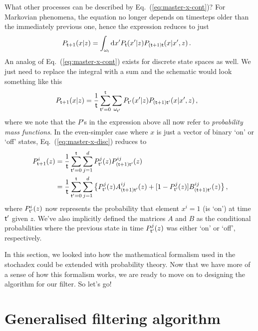 What other processes can be described by Eq.~(\ref{eq:master-x-cont})? For Markovian phenomena, the equation no longer depends on timesteps older than the immediately previous one, hence the expression reduces to just
\begin{align}
P_{{\sf t}+1}(x\vert z) &= \int_{\omega_{\sf t}}{\rm d}x' P_{\sf t}(x'\vert z) P_{({\sf t}+1){\sf t}}(x\vert x',z) \label{eq:master-x-cont-markov} \,.
\end{align}
An analog of Eq.~(\ref{eq:master-x-cont}) exists for discrete state spaces as well. We just need to replace the integral with a sum and the schematic would look something like this
\begin{align}
P_{{\sf t}+1}(x\vert z) &= \frac{1}{{\sf t}}\sum_{{\sf t}'=0}^{\sf t}\sum_{\omega_{{\sf t}'}} P_{{\sf t}'}(x'\vert z) P_{({\sf t}+1){\sf t}'}(x \vert x', z) \label{eq:master-x-disc} \,,
\end{align}
where we note that the $P$'s in the expression above all now refer to \emph{probability mass functions}. In the even-simpler case where $x$ is just a vector of binary `on' or `off' states, Eq.~(\ref{eq:master-x-disc}) reduces to
\begin{align}
P^i_{{\sf t}+1}(z) &= \frac{1}{{\sf t}}\sum_{{\sf t}'=0}^{\sf t} \sum_{j=1}^d P^j_{{\sf t}'}(z) P^{ij}_{({\sf t}+1){\sf t}'}(z) \nonumber \\
&= \frac{1}{{\sf t}}\sum_{{\sf t}'=0}^{\sf t} \sum_{j=1}^d \big\{ P^j_{{\sf t}'}(z) A^{ij}_{({\sf t}+1){\sf t}'}(z) + [1-P^j_{{\sf t}'}(z)] B^{ij}_{({\sf t}+1){\sf t}'}(z) \big\} \label{eq:master-x-disc-binary}\,,
\end{align}
where $P^i_{{\sf t}'}(z)$ now represents the probability that element $x^i=1$ (is `on') at time ${\sf t}'$ given $z$. We've also implicitly defined the matrices $A$ and $B$ as the conditional probabilities where the previous state in time $P^j_{{\sf t}'}(z)$ was either `on' or `off', respectively.

In this section, we looked into how the mathematical formalism used in the stochadex could be extended with probability theory. Now that we have more of a sense of how this formalism works, we are ready to move on to designing the algorithm for our filter. So let's go!

\section{\sffamily Generalised filtering algorithm}

